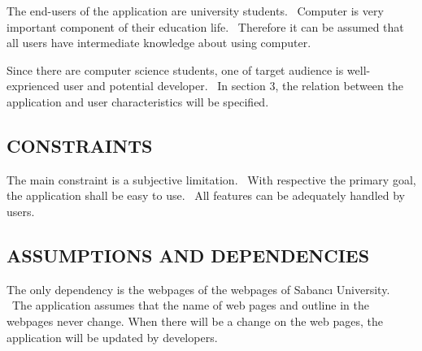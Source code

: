 \documentclass[twoside,letterpaper]{article}
\begin{document}
{\color{black}
The end-users of the application are university students. \ Computer is very important component of their education life. \ Therefore it can be assumed that all users have intermediate knowledge about using computer.}

\smallskip

{ \noindent {}\color{black}
Since there are computer science students, one of target audience is well-exprienced user and potential developer. \ In section 3, the relation between the application and user characteristics will be specified.}

\subsection[CONSTRAINTS]{\rmfamily\bfseries\color{black}
CONSTRAINTS}

{\color{black}
The main constraint is a subjective limitation. \ With respective the primary goal, the application shall be easy to use. \ All features can be adequately handled by users. 
}

\smallskip


\smallskip


\subsection[ASSUMPTIONS AND
DEPENDENCIES]{\rmfamily\bfseries\color{black}
ASSUMPTIONS AND DEPENDENCIES}

{\color{black}
The only dependency is the webpages of the webpages of Sabanc\i{} University. \ The application assumes that the name of web pages and outline in the webpages never change. When there will be a change on the web pages, the application will be updated by developers.  
}
\end{document}
